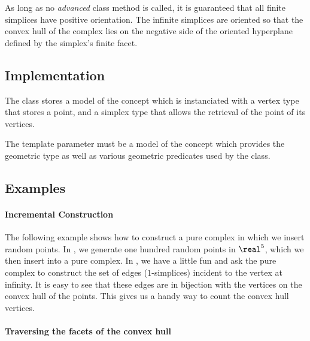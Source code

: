 {As long as no \emph{advanced} class method is called, it is guaranteed that
all finite simplices have positive orientation. The infinite simplices are
oriented so that the convex hull of the complex lies on the negative side of
the oriented hyperplane defined by the simplex's finite facet.



\subsection{Implementation}

The class  stores a model 
of the concept  which is instanciated with a
vertex type that stores a point, and a simplex type that allows the retrieval
of the point of its vertices.

The template parameter  must be a model of the concept
 which provides the geometric  type as well
as various geometric predicates used by the  class.


\subsection{Examples}

\paragraph{Incremental Construction}

The following example shows how to construct a pure complex in which we insert
random points. In , we generate one hundred random points in
$\real^5$, which we then insert into a pure complex. In , we have
a little fun and ask the pure complex to construct the set of edges
($1$-simplices) incident to the vertex at infinity. It is easy to see that
these edges are in bijection with the vertices on the convex hull of the
points. This gives us a handy way to count the convex hull vertices.


\paragraph{Traversing the facets of the convex hull}

}

